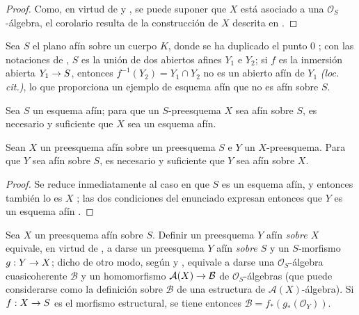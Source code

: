 \documentclass[oneside,10pt]{amsart}
\makeatletter
\newcommand{\ega@arrow}[2]{\mathchoice{#1}{#2}{#2}{#2}}
\renewcommand{\to}{\ega@arrow{\longrightarrow}{\rightarrow}}
\newcommand{\oldpage}[2][]{\marginnote{\normalfont\footnotesize\textbf{#1}~|~#2}\ignorespaces}
\let\EGAOriginalLabel\label
\renewcommand{\label}[1]{\phantomsection\EGAOriginalLabel{#1}}
\makeatother
\begin{document}
\begin{proof}
\oldpage[II]{9}
Como, en virtud de  y , se puede suponer que $X$ está asociado a una $\mathcal{O}_S$-álgebra, el corolario resulta de la construcción de $X$ descrita en .
\end{proof}

\begin{example}[1.3.3]
\label{II.1.3.3-fr}
Sea $S$ el plano afín sobre un cuerpo $K$, donde se ha duplicado el punto $0$ ; con las notaciones de , $S$ es la unión de dos abiertos afines $Y_1$ e $Y_2$; si $f$ es la inmersión abierta $Y_1\to S$, entonces $f^{-1}(Y_2)=Y_1\cap Y_2$ no es un abierto afín de $Y_1$ \emph{(loc. cit.)}, lo que proporciona un ejemplo de esquema afín que no es afín sobre $S$.
\end{example}

\begin{corollary}[1.3.4]
\label{II.1.3.4-fr}
Sea $S$ un esquema afín; para que un $S$-preesquema $X$ sea afín sobre $S$, es necesario y suficiente que $X$ sea un esquema afín.
\end{corollary}

\begin{corollary}[1.3.5]
\label{II.1.3.5-fr}
Sean $X$ un preesquema afín sobre un preesquema $S$ e $Y$ un $X$-preesquema.
Para que $Y$ sea afín sobre $S$, es necesario y suficiente que $Y$ sea afín sobre $X$.
\end{corollary}

\begin{proof}
Se reduce inmediatamente al caso en que $S$ es un esquema afín, y entonces también lo es $X$ ; las dos condiciones del enunciado expresan entonces que $Y$ es un esquema afín .
\end{proof}

\begin{env}[1.3.6]
\label{II.1.3.6-fr}
Sea $X$ un preesquema afín sobre $S$.
Definir un preesquema $Y$ afín \emph{sobre $X$} equivale, en virtud de , a darse un preesquema $Y$ afín \emph{sobre $S$} y un $S$-morfismo $g:Y\to X$; dicho de otro modo, según  y , equivale a darse una $\mathcal{O}_S$-álgebra cuasicoherente $\mathcal{B}$ y un homomorfismo $\mathcal{A}(X)\to\mathcal{B}$ de $\mathcal{O}_S$-álgebras (que puede considerarse como la definición sobre $\mathcal{B}$ de una estructura de $\mathcal{A}(X)$-álgebra).
Si $f:X\to S$ es el morfismo estructural, se tiene entonces $\mathcal{B}=f_*(g_*(\mathcal{O}_Y))$.
\end{env}
\end{document}
